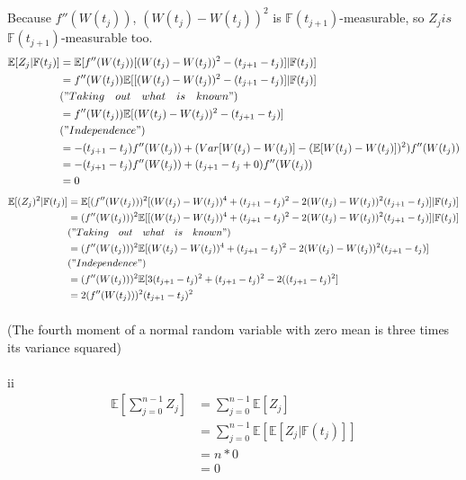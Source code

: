 \documentclass{article}
\begin{document}
\paragraph{}{Because $f''(W(t_j))$, $(W(t_j)-W(t_j))^2$ is $\mathbb{F}(t_{j+1})$-measurable, so $Z_j is $ $\mathbb{F}(t_{j+1})$-measurable too.}
\begin{align*}
  \mathbb{E}[Z_j|\mathbb{F}(t_j)] & = \mathbb{E}[f''(W(t_j))[(W(t_j)-W(t_j))^2-(t_{j+1}-t_j)] |\mathbb{F}(t_j)]\\
   & =f''(W(t_j))\mathbb{E}[[(W(t_j)-W(t_j))^2-(t_{j+1}-t_j)] |\mathbb{F}(t_j)] \\
    &("Taking\quad out\quad what\quad is\quad known")\\
   & =f''(W(t_j))\mathbb{E}[(W(t_j)-W(t_j))^2-(t_{j+1}-t_j)]\\
    &("Independence")\\
   & =-(t_{j+1}-t_j)f''(W(t_j))+(Var[W(t_j)-W(t_j)]-(\mathbb{E}[W(t_j)-W(t_j)])^2)f''(W(t_j))\\
   &=-(t_{j+1}-t_j)f''(W(t_j))+(t_{j+1}-t_j+0)f''(W(t_j))\\
   &=0
\end{align*}
\begin{align*}
 \mathbb{E}[(Z_j)^2|\mathbb{F}(t_j)] & = \mathbb{E}[(f''(W(t_j)))^2[(W(t_j)-W(t_j))^4+(t_{j+1}-t_j)^2-2(W(t_j)-W(t_j))^2(t_{j+1}-t_j)] |\mathbb{F}(t_j)]\\
 &=(f''(W(t_j)))^2\mathbb{E}[[(W(t_j)-W(t_j))^4+(t_{j+1}-t_j)^2-2(W(t_j)-W(t_j))^2(t_{j+1}-t_j)] |\mathbb{F}(t_j)]\\
 &("Taking\quad out\quad what\quad is\quad known")\\
 &=(f''(W(t_j)))^2\mathbb{E}[(W(t_j)-W(t_j))^4+(t_{j+1}-t_j)^2-2(W(t_j)-W(t_j))^2(t_{j+1}-t_j)] \\
 & ("Independence")\\
  &=(f''(W(t_j)))^2\mathbb{E}[3(t_{j+1}-t_j)^2+(t_{j+1}-t_j)^2-2((t_{j+1}-t_j)^2] \\
   & =2(f''(W(t_j)))^2(t_{j+1}-t_j)^2
\end{align*}
\paragraph{}{(The fourth moment of a normal random variable with zero mean is three times its variance squared)  }
\paragraph{}{ii}
\begin{align*}
  \mathbb{E}[\sum_{j=0}^{n-1}Z_j] & =\sum_{j=0}^{n-1} \mathbb{E}[Z_j]\\
   & = \sum_{j=0}^{n-1} \mathbb{E}[\mathbb{E}[Z_j|\mathbb{F}(t_j)]]\\
 & =n*0 \\
   & =0
\end{align*}
\end{document}
